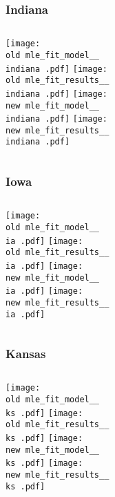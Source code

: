 \documentclass{beamer}
\newcommand{\old}{current_two_stage_output/pyseir/state_summaries/reports/}
\newcommand{\new}{new_shortest_t_delta/pyseir/state_summaries/reports/}
\newcommand{\indiana}{Indiana__18}
\newcommand{\ia}{Iowa__19}
\newcommand{\ks}{Kansas__20}
\begin{document}
\begin{frame}
\frametitle{Indiana}
    \begin{columns}[t]

       \texttt{[image: \\old mle\_fit\_model\_\_\\indiana .pdf]}
       \texttt{[image: \\old mle\_fit\_results\_\_\\indiana .pdf]}   
       \texttt{[image: \\new mle\_fit\_model\_\_\\indiana .pdf]}
       \texttt{[image: \\new mle\_fit\_results\_\_\\indiana .pdf]}   
\end{columns}
\end{frame}


\begin{frame}
\frametitle{Iowa}
    \begin{columns}[t]

       \texttt{[image: \\old mle\_fit\_model\_\_\\ia .pdf]}
       \texttt{[image: \\old mle\_fit\_results\_\_\\ia .pdf]}   
       \texttt{[image: \\new mle\_fit\_model\_\_\\ia .pdf]}
       \texttt{[image: \\new mle\_fit\_results\_\_\\ia .pdf]}   
\end{columns}
\end{frame}


\begin{frame}
\frametitle{Kansas}
    \begin{columns}[t]

       \texttt{[image: \\old mle\_fit\_model\_\_\\ks .pdf]}
       \texttt{[image: \\old mle\_fit\_results\_\_\\ks .pdf]}   
       \texttt{[image: \\new mle\_fit\_model\_\_\\ks .pdf]}
       \texttt{[image: \\new mle\_fit\_results\_\_\\ks .pdf]}   
\end{columns}
\end{frame}
\end{document}
